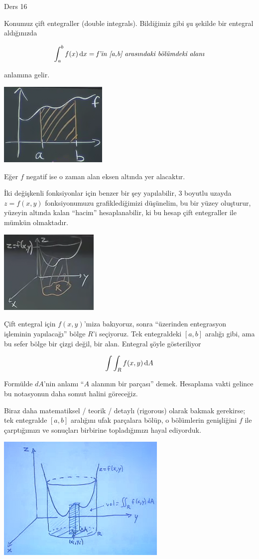 \documentclass[12pt,fleqn]{article}\usepackage{../../common}
\begin{document}
Ders 16

Konumuz çift entegraller (double integrals). Bildiğimiz gibi şu şekilde bir
entegral aldığınızda

$$ \int_a^bf(x) \,\mathrm{d} x = \textit{f'in [a,b] arasındaki bölümdeki alanı} $$

anlamına gelir. 

\includegraphics[height=4cm]{16_1.png}

Eğer $f$ negatif ise o zaman alan eksen altında yer alacaktır. 

İki değişkenli fonksiyonlar için benzer bir şey yapılabilir, 3 boyutlu uzayda
$z=f(x,y)$ fonksiyonumuzu grafiklediğimizi düşünelim, bu bir yüzey oluşturur,
yüzeyin altında kalan ``hacim'' hesaplanabilir, ki bu hesap çift entegraller ile
mümkün olmaktadır.

\includegraphics[height=4cm]{16_2.png}

Çift entegral için $f(x,y)$'miza bakıyoruz, sonra ``üzerinden entegrasyon
işleminin yapılacağı'' bölge $R$'i seçiyoruz. Tek entegraldeki $[a,b]$ aralığı
gibi, ama bu sefer bölge bir çizgi değil, bir alan. Entegral şöyle gösteriliyor

$$ \int \int_R f(x,y) \,\mathrm{d} A $$

Formülde $dA$'nin anlamı ``$A$ alanının bir parçası'' demek. Hesaplama vakti
gelince bu notasyonun daha somut halini göreceğiz.

Biraz daha matematiksel / teorik / detaylı (rigorous) olarak bakmak gerekirse;
tek entegralde $[a,b]$ aralığını ufak parçalara bölüp, o bölümlerin genişliğini
$f$ ile çarptığımızı ve sonuçları birbirine topladığımızı hayal ediyorduk.

\includegraphics[height=6cm]{16_3.png}
\end{document}
